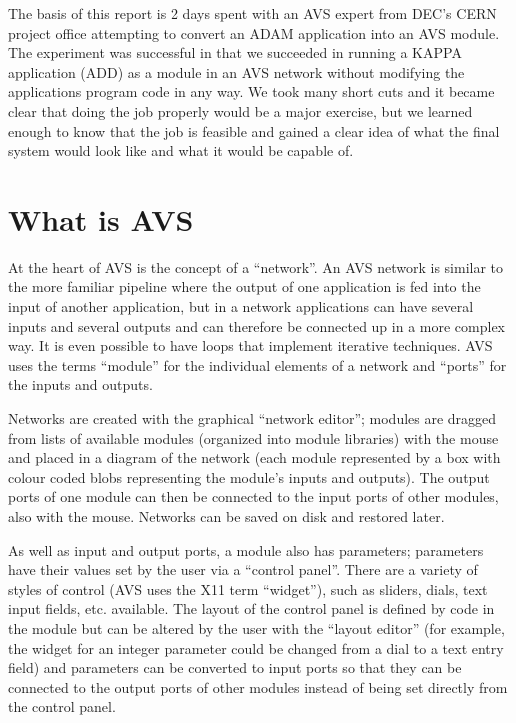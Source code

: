 The basis of this report is 2 days spent with an AVS expert from DEC's CERN
project office attempting to convert an ADAM application into an AVS module.
The experiment was successful in that we succeeded in running a KAPPA
application (ADD) as a module in an AVS network without modifying the
applications program code in any way. We took many short cuts and it became
clear that doing the job properly would be a major exercise, but we
learned enough to know that the job is feasible and gained a clear idea of
what the final system would look like and what it would be capable of.

\section{What is AVS}

At the heart of AVS is the concept of a ``network''. An AVS network is similar
to  the more familiar pipeline where the output of one application is fed into
the input of another application, but in a network applications can have
several inputs and several outputs and can therefore be connected up in a more
complex way. It is even possible to have loops that implement iterative
techniques. AVS uses the terms ``module'' for the individual elements of a
network and ``ports''  for the inputs and outputs.

Networks are created with the graphical ``network editor''; modules are dragged
from lists of available modules (organized into module libraries) with the
mouse and placed in a diagram of the network (each module represented by a box
with colour coded blobs representing the module's inputs and outputs). The
output ports of one module can then be connected to the input ports of other
modules, also with the mouse. Networks can be saved on disk and restored later.

As well as input and output ports, a module also has parameters; parameters
have their values set by the user via a ``control panel''. There are a variety
of styles of control (AVS uses the X11 term ``widget''), such as sliders,
dials, text input fields, etc. available. The layout of the control panel is
defined by code in the module but can be altered by the user with the ``layout
editor'' (for example, the widget for an integer parameter could be changed
from a dial to a text entry field) and parameters can be converted to input
ports so that they can be connected to the output ports of other modules
instead of being set directly from the control panel.

